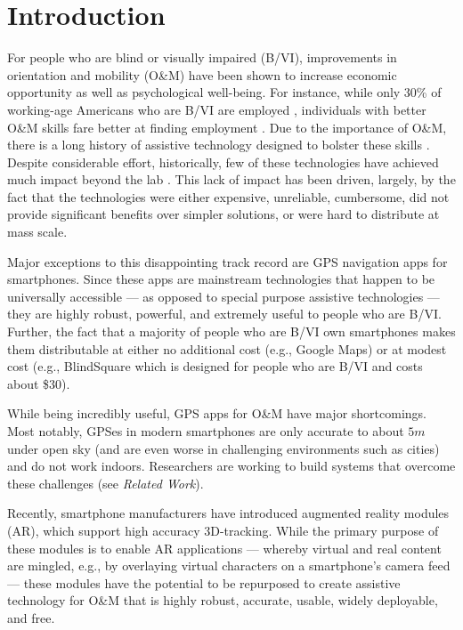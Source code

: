 \documentclass[chi_draft]{sigchi}
\newcommand{\BVI}{B/VI\xspace}
\newcommand{\OM}{O\&M\xspace}
\begin{document}
\section{Introduction}
For people who are blind or visually impaired (\BVI), improvements in orientation and mobility (\OM) have been shown to increase economic opportunity as well as psychological well-being.  For instance, while only 30\% of working-age Americans who are \BVI are employed \cite{employmentstatistics2017, kirchner1999looking}, individuals with better \OM skills fare better at finding employment \cite{crudden1998comprehensive, crudden1999barriers, leonard1999factors, o1999employment}.  Due to the importance of \OM, there is a long history of assistive technology designed to bolster these skills  \cite{benjamin1973new, borenstein1997guidecane}.  Despite considerable effort, historically, few of these technologies have achieved much impact beyond the lab \cite{wiener2010foundations}.  This lack of impact has been driven, largely, by the fact that the technologies were either expensive, unreliable, cumbersome, did not provide significant benefits over simpler solutions, or were hard to distribute at mass scale.

Major exceptions to this disappointing track record are GPS navigation apps for smartphones.  Since these apps are mainstream technologies that happen to be universally accessible --- as opposed to special purpose assistive technologies --- they are highly robust, powerful, and extremely useful to people who are \BVI.  Further, the fact that a majority of people who are \BVI own smartphones \cite{morris2014blind} makes them distributable at either no additional cost (e.g., Google Maps) or at modest cost (e.g., BlindSquare which is designed for people who are \BVI and costs about \$30).

While being incredibly useful, GPS apps for \OM have major shortcomings.  Most notably, GPSes in modern smartphones are only accurate to about $5m$ under open sky (and are even worse in challenging environments such as cities) and do not work indoors.  Researchers are working to build systems that overcome these challenges (see \emph{Related Work}).

Recently, smartphone manufacturers have introduced augmented reality modules (AR), which support high accuracy 3D-tracking.  While the primary purpose of these modules is to enable AR applications --- whereby virtual and real content are mingled, e.g., by overlaying virtual characters on a smartphone's camera feed --- these modules have the potential to be repurposed to create assistive technology for \OM that is highly robust, accurate, usable, widely deployable, and free.
\end{document}

